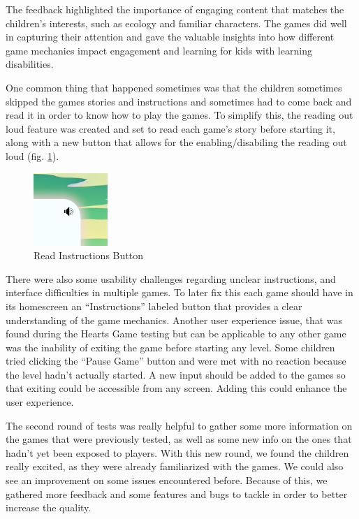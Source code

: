The feedback highlighted the importance of engaging content that matches the children’s interests, such as ecology and familiar characters. The games did well in capturing their attention and gave the valuable insights into how different game mechanics impact engagement and learning for kids with learning disabilities.

One common thing that happened sometimes was that the children sometimes skipped the games stories and instructions and sometimes had to come back and read it in order to know how to play the games. To simplify this, the reading out loud feature was created and set to read each game's story before starting it, along with a new button that allows for the enabling/disabiling the reading out loud (fig. \ref{fig:readInstructionsButton}).

\begin{figure}[!h]
    \centering
    \includegraphics[width=0.1\linewidth]{Chapters/game_changes/read-sound-icon.png}
    \caption{Read Instructions Button}
    \label{fig:readInstructionsButton}
\end{figure}


There were also some usability challenges regarding unclear instructions, and interface difficulties in multiple games. To later fix this each game should have in its homescreen an ``Instructions'' labeled button that provides a clear understanding of the game mechanics. Another user experience issue, that was found during the Hearts Game testing but can be applicable to any other game was the inability of exiting the game before starting any level. Some children tried clicking the ``Pause Game'' button and were met with no reaction because the level hadn't actually started. A new input should be added to the games so that exiting could be accessible from any screen. Adding this could enhance the user experience.

The second round of tests was really helpful to gather some more information on the games that were previously tested, as well as some new info on the ones that hadn't yet been exposed to players. With this new round, we found the children really excited, as they were already familiarized with the games. We could also see an improvement on some issues encountered before. Because of this, we gathered more feedback and some features and bugs to tackle in order to better increase the quality.

